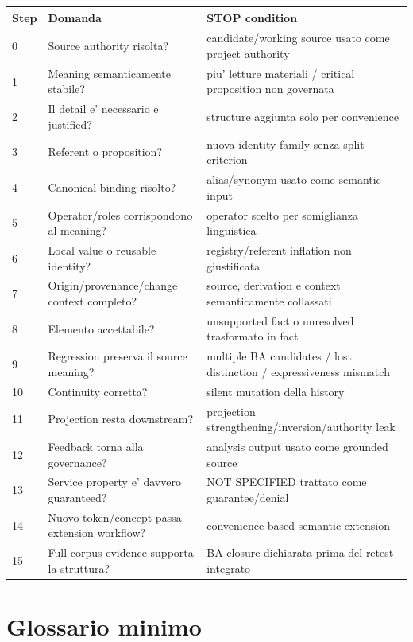 \documentclass[11pt,a4paper]{article}
\begin{document}
\small
\begin{longtable}{L{0.08\textwidth}L{0.30\textwidth}L{0.50\textwidth}}
\toprule
\textbf{Step} & \textbf{Domanda} & \textbf{STOP condition} \\
\midrule{} & Source authority risolta? & candidate/working source usato come project authority \\
1 & Meaning semanticamente stabile? & piu' letture materiali / critical proposition non governata \\
2 & Il detail e' necessario e justified? & structure aggiunta solo per convenience \\
3 & Referent o proposition? & nuova identity family senza split criterion \\
4 & Canonical binding risolto? & alias/synonym usato come semantic input \\
5 & Operator/roles corrispondono al meaning? & operator scelto per somiglianza linguistica \\
6 & Local value o reusable identity? & registry/referent inflation non giustificata \\
7 & Origin/provenance/change context completo? & source, derivation e context semanticamente collassati \\
8 & Elemento accettabile? & unsupported fact o unresolved trasformato in fact \\
9 & Regression preserva il source meaning? & multiple BA candidates / lost distinction / expressiveness mismatch \\
10 & Continuity corretta? & silent mutation della history \\
11 & Projection resta downstream? & projection strengthening/inversion/authority leak \\
12 & Feedback torna alla governance? & analysis output usato come grounded source \\
13 & Service property e' davvero guaranteed? & NOT SPECIFIED trattato come guarantee/denial \\
14 & Nuovo token/concept passa extension workflow? & convenience-based semantic extension \\
15 & Full-corpus evidence supporta la struttura? & BA closure dichiarata prima del retest integrato \\
\bottomrule
\end{longtable}
\normalsize


\section{Glossario minimo}
\end{document}

